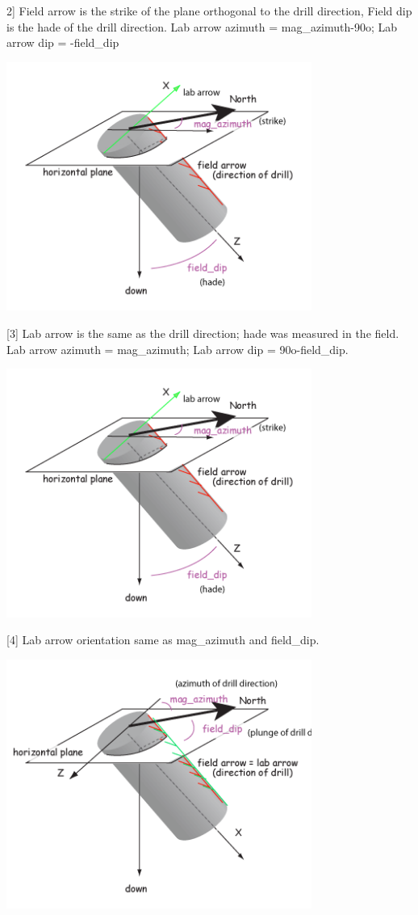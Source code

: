 \documentclass[11pt]{book}
\begin{document}
{{  2] Field arrow is the strike of the plane orthogonal to the drill direction, Field dip is the hade of the drill direction. Lab arrow azimuth = mag_azimuth-90o; Lab arrow dip = -field_dip
  
    \includegraphics[width=10cm]{EPSfiles/strike_dip.png}

  [3] Lab arrow is the same as the drill direction; hade was measured in the field. Lab arrow azimuth = mag_azimuth; Lab arrow dip = 90o-field_dip.
  
      \includegraphics[width=10cm]{EPSfiles/strike_dip.png}
  
  [4] Lab arrow orientation same as mag_azimuth and field_dip.
  
        \includegraphics[width=10cm]{EPSfiles/field-lab.png}
        
}}
\end{document}
